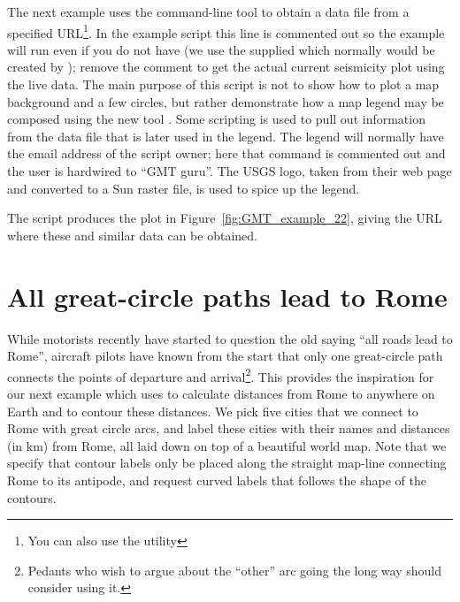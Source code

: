 The next example uses the command-line tool  to obtain a data file
from a specified URL\footnote{You can also use the utility }.
In the example script this line is commented out so the
example will run even if you do not have  (we use the supplied
 which normally would be created by ); remove the comment to
get the actual current seismicity plot using the live data.  The main purpose of
this script is not to show how to plot a map background and a few circles, but
rather demonstrate how a map legend may be composed using the new tool .
Some scripting is used to pull out information from the data file that is later
used in the legend.  The legend will normally have the email address of the script
owner; here that command is commented out and the user is hardwired to ``GMT guru''.
The USGS logo, taken from their web page and converted to a Sun raster file, is used
to spice up the legend.


The script produces the plot in Figure~\ref{fig:GMT_example_22}, giving the URL
where these and similar data can be obtained.


\section{All great-circle paths lead to Rome}
\label{sec:example_23}

While motorists recently have started to question the old saying ``all roads lead to Rome'',
aircraft pilots have known from the start that only one great-circle path connects the
points of departure and arrival\footnote{Pedants who wish to argue about the ``other''
arc going the long way should consider using it.}.  This provides the inspiration for our next
example which uses  to calculate distances from Rome to anywhere on
Earth and  to contour these distances.  We pick five cities that
we connect to Rome with great circle arcs, and label these cities with their names and
distances (in km) from Rome, all laid down on top of a beautiful world map.  Note that
we specify that contour labels only be placed along the straight map-line connecting
Rome to its antipode, and request curved labels that follows the shape of the contours.

